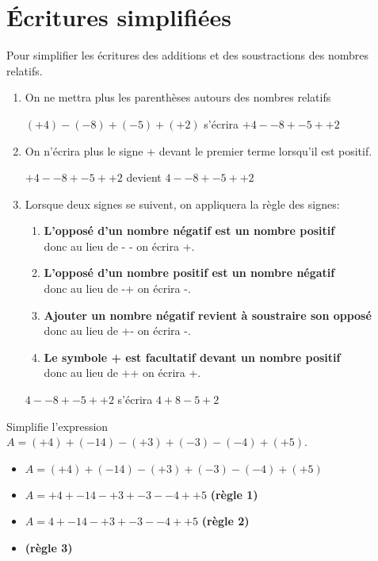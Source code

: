 \section{Écritures simplifiées}
\begin{methode*1}
  Pour simplifier les écritures des additions et des soustractions des nombres relatifs.
  \begin{enumerate}
    \item On ne mettra plus les parenthèses autours des nombres relatifs
      \begin{center}
        $(+4)-(-8)+(-5)+(+2)$ s'écrira $+4--8+-5++2$
      \end{center}
    \item On n'écrira plus le signe + devant le premier terme lorsqu'il est positif.
      \begin{center}
        $+4--8+-5++2$ devient $4--8+-5++2$
      \end{center}
    \item Lorsque deux signes se suivent, on appliquera la règle des signes:
      \begin{enumerate}
        \item \textbf{L'opposé d'un nombre négatif est un nombre positif} \\ donc au lieu de - - on écrira +.
        \item \textbf{L'opposé d'un nombre positif est un nombre négatif} \\ donc au lieu de -+ on écrira -.
        \item \textbf{Ajouter un nombre négatif revient à soustraire son opposé} \\ donc au lieu de +- on écrira -.
        \item \textbf{Le symbole + est facultatif devant un nombre positif} \\ donc au lieu de ++ on écrira +.
      \end{enumerate}
      \begin{center}
        $4--8+-5++2$ s'écrira $4+8-5+2$
      \end{center}
  \end{enumerate}
  \begin{center}
  \end{center}
  \exercice
  Simplifie l'expression $A=(+4)+(-14)-(+3)+(-3)-(-4)+(+5)$.
  \correction
  \begin{itemize}
    \item[] $A=(+4)+(-14)-(+3)+(-3)-(-4)+(+5)$
    \item[] $A=+4+-14-+3+-3--4++5$  \textbf{(règle 1)}
    \item[] $A=4+-14-+3+-3--4++5$  \textbf{(règle 2)}
    \item[]  \textbf{(règle 3)}
  \end{itemize}
\end{methode*1}

